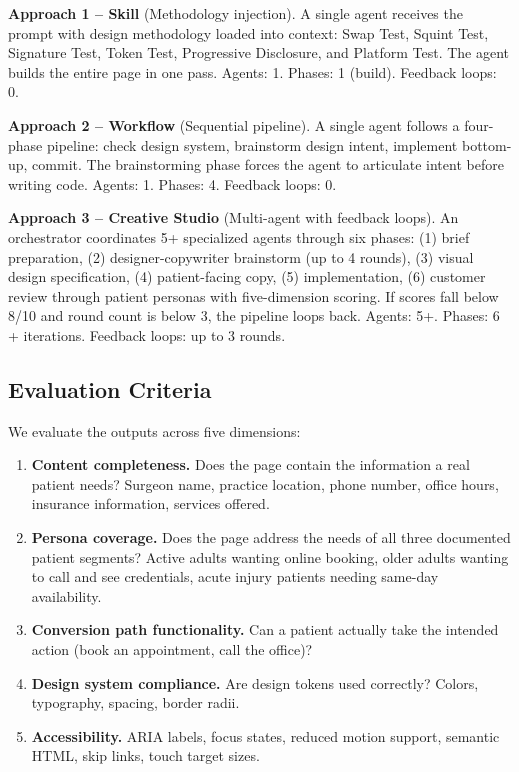 \documentclass[conference]{IEEEtran}
\providecommand{\tightlist}{%
  \setlength{\itemsep}{0pt}\setlength{\parskip}{0pt}}
\begin{document}
\textbf{Approach 1 -- Skill} (Methodology injection). A single agent receives the prompt with design methodology loaded into context: Swap Test, Squint Test, Signature Test, Token Test, Progressive Disclosure, and Platform Test. The agent builds the entire page in one pass. Agents: 1. Phases: 1 (build). Feedback loops: 0.

\textbf{Approach 2 -- Workflow} (Sequential pipeline). A single agent follows a four-phase pipeline: check design system, brainstorm design intent, implement bottom-up, commit. The brainstorming phase forces the agent to articulate intent before writing code. Agents: 1. Phases: 4. Feedback loops: 0.

\textbf{Approach 3 -- Creative Studio} (Multi-agent with feedback loops). An orchestrator coordinates 5+ specialized agents through six phases: (1) brief preparation, (2) designer-copywriter brainstorm (up to 4 rounds), (3) visual design specification, (4) patient-facing copy, (5) implementation, (6) customer review through patient personas with five-dimension scoring. If scores fall below 8/10 and round count is below 3, the pipeline loops back. Agents: 5+. Phases: 6 + iterations. Feedback loops: up to 3 rounds.

\subsection{Evaluation Criteria}\label{evaluation-criteria}

We evaluate the outputs across five dimensions:

\begin{enumerate}
\def\labelenumi{\arabic{enumi}.}
\tightlist
\item
  \textbf{Content completeness.} Does the page contain the information a real patient needs? Surgeon name, practice location, phone number, office hours, insurance information, services offered.
\item
  \textbf{Persona coverage.} Does the page address the needs of all three documented patient segments? Active adults wanting online booking, older adults wanting to call and see credentials, acute injury patients needing same-day availability.
\item
  \textbf{Conversion path functionality.} Can a patient actually take the intended action (book an appointment, call the office)?
\item
  \textbf{Design system compliance.} Are design tokens used correctly? Colors, typography, spacing, border radii.
\item
  \textbf{Accessibility.} ARIA labels, focus states, reduced motion support, semantic HTML, skip links, touch target sizes.
\end{enumerate}
\end{document}
